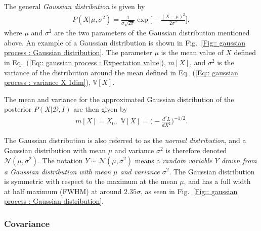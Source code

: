 \documentclass[twoside,english]{uiofysmaster}
\begin{document}
{{The general \textit{Gaussian distribution} is given by
\begin{align}
P(X| \mu, \sigma^2) = \frac{1}{\sigma \sqrt{2 \pi}} \exp \Bigg[ - \frac{(X- \mu)^2}{2 \sigma^2} \Bigg],
\end{align}
where $\mu$ and $\sigma^2$ are the two parameters of the Gaussian distribution mentioned above. An example of a Gaussian distribution is shown in Fig.~\ref{Fig:: gaussian process : Gaussian distribution}. The parameter $\mu$ is the mean value of $X$ defined in Eq.~(\ref{Eq:: gaussian process : Expectation value}), $ m[X]$, and $\sigma^2$ is the variance of the distribution around the mean defined in Eq.~(\ref{Eq:: gaussian process : variance X 1dim}), $\mathbb{V}[X]$.  

The mean and variance for the approximated Gaussian distribution of the posterior $P(X|\mathcal{D}, I)$ are then given by
\begin{align}
m[X] = X_0\text{, }~ \mathbb{V}[X] = \Big( - \frac{d^2L}{dX^2} \Big)^{-1/2}.
\end{align}

The Gaussian distribution is also referred to as the \textit{normal distribution}, and a Gaussian distribution with mean $\mu$ and variance $\sigma^2$ is therefore denoted $\mathcal{N}(\mu, \sigma^2)$. The notation $Y \sim \mathcal{N}(\mu, \sigma^2)$ means a \textit{random variable $Y$ drawn from a Gaussian distribution with mean $\mu$ and variance $\sigma^2$}. The Gaussian distribution is symmetric with respect to the maximum at the mean $\mu$, and has a full width at half maximum (FWHM) at around $2.35 \sigma$, as seen in Fig.~\ref{Fig:: gaussian process : Gaussian distribution}.  



\subsubsection{Covariance}\label{Sec:: gaussian process : Covariance}




}}
\end{document}
